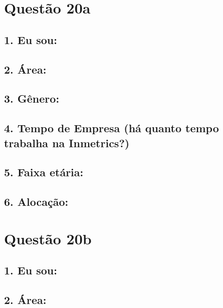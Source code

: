 \documentclass[]{book}
\begin{document}
\hypertarget{questao-20a}{%
\section{Questão 20a}\label{questao-20a}}

\hypertarget{eu-sou-53}{%
\subsection{1. Eu sou:}\label{eu-sou-53}}

\hypertarget{area-53}{%
\subsection{2. Área:}\label{area-53}}

\hypertarget{genero-53}{%
\subsection{3. Gênero:}\label{genero-53}}

\hypertarget{tempo-de-empresa-ha-quanto-tempo-trabalha-na-inmetrics-53}{%
\subsection{4. Tempo de Empresa (há quanto tempo trabalha na Inmetrics?)}\label{tempo-de-empresa-ha-quanto-tempo-trabalha-na-inmetrics-53}}

\hypertarget{faixa-etaria-53}{%
\subsection{5. Faixa etária:}\label{faixa-etaria-53}}

\hypertarget{alocacao-53}{%
\subsection{6. Alocação:}\label{alocacao-53}}

\hypertarget{questao-20b}{%
\section{Questão 20b}\label{questao-20b}}

\hypertarget{eu-sou-54}{%
\subsection{1. Eu sou:}\label{eu-sou-54}}

\hypertarget{area-54}{%
\subsection{2. Área:}\label{area-54}}
\end{document}
